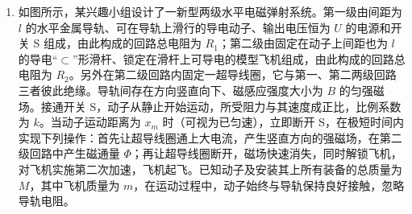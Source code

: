 \documentclass[\gkver]{gaokaozhenti}
\begin{document}
\begin{enumerate}
\jdanswer{
\begin{enumerate}
	\item
	$4\Ums$
	\item
	$0.9\UJ$
	\item
	$0.2\Um$
	\item
	$3\UN$
\end{enumerate}
}

\item
如图所示，某兴趣小组设计了一新型两级水平电磁弹射系统。第一级由间距为 $l$ 的水平金属导轨、可在导轨上滑行的导电动子、输出电压恒为 $U$ 的电源和开关 S 组成，由此构成的回路总电阻为 $R_{1}$；第二级由固定在动子上间距也为 $l$ 的导电“$\subset$”形滑杆、锁定在滑杆上可导电的模型飞机组成，由此构成的回路总电阻为 $R_{2}$。另外在第二级回路内固定一超导线圈，它与第一、第二两级回路三者彼此绝缘。导轨间存在方向竖直向下、磁感应强度大小为 $B$ 的匀强磁场。接通开关 S，动子从静止开始运动，所受阻力与其速度成正比，比例系数为 $k$。当动子运动距离为 $x_{m}$ 时（可视为已匀速），立即断开 S，在极短时间内实现下列操作：首先让超导线圈通上大电流，产生竖直方向的强磁场，在第二级回路中产生磁通量 $\Phi$；再让超导线圈断开，磁场快速消失，同时解锁飞机，对飞机实施第二次加速，飞机起飞。已知动子及安装其上所有装备的总质量为 $M$，其中飞机质量为 $m$，在运动过程中，动子始终与导轨保持良好接触，忽略导轨电阻。


\end{enumerate}
\end{document}

